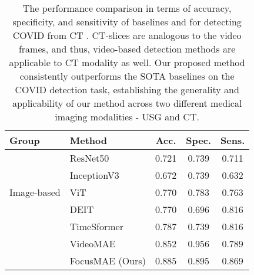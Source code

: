\begin{table}[!t]
    \footnotesize
	\centering
	\begin{tabular}{llccc}
		\toprule
		{\textbf{Group}} & {\textbf{Method}} & {\textbf{Acc.}} &  {\textbf{Spec.}} & {\textbf{Sens.}} \\
		\midrule
		\multirow{5}{*}{Image-based} 
		& ResNet50 \cite{resnet} & 0.721 & 0.739 & 0.711 \\
		& InceptionV3 \cite{inception} & 0.672 & 0.739 & 0.632 \\
        \cmidrule{2-5}
        & ViT \cite{vit} & 0.770 & 0.783 & 0.763 \\
		& DEIT \cite{touvron2021training} & 0.770 & 0.696 & 0.816 \\
		\midrule
		\multirow{3}{*}{Video-based} 
        & TimeSformer \cite{timesformer} & 0.787 & 0.739 & 0.816 \\
		& VideoMAE \cite{videomae} & 0.852 & 0.956 & 0.789 \\
		\cmidrule{2-5}
		& FocusMAE (Ours) & 0.885 & 0.895 & 0.869 \\
		\bottomrule
	\end{tabular}
	\caption[Comparison of SOTA and \focusmae for Covid detection]{The performance comparison in terms of accuracy, specificity, and sensitivity of baselines and \focusmae for detecting COVID from CT \cite{covidctmd}. CT-slices are analogous to the video frames, and thus, video-based detection methods are applicable to CT modality as well. Our proposed method consistently outperforms the SOTA baselines on the COVID detection task, establishing the generality and applicability of our method across two different medical imaging modalities - USG and CT. }
	\label{tab:covid}
\end{table}

